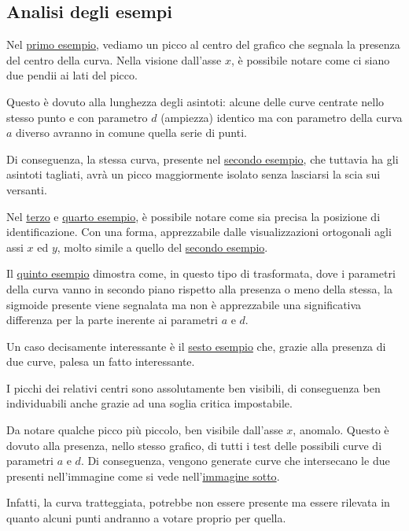 \newpage

\newpage

\subsection{Analisi degli esempi}
Nel \hyperref[fig:sintentica_ostinelli_1]{primo esempio}, vediamo un picco al centro del grafico che segnala la presenza del centro della curva. Nella visione dall'asse $x$, è possibile notare come ci siano due pendii ai lati del picco.\par
Questo è dovuto alla lunghezza degli asintoti: alcune delle curve centrate nello stesso punto e con parametro $d$ (ampiezza) identico ma con parametro della curva $a$ diverso avranno in comune quella serie di punti.\par
Di conseguenza, la stessa curva, presente nel \hyperref[fig:sintentica_ostinelli_2]{secondo esempio}, che tuttavia ha gli asintoti tagliati, avrà un picco maggiormente isolato senza lasciarsi la scia sui versanti.\par
Nel \hyperref[fig:sintentica_ostinelli_3]{terzo} e \hyperref[fig:sintentica_ostinelli_4]{quarto esempio}, è possibile notare come sia precisa la posizione di identificazione. Con una forma, apprezzabile dalle visualizzazioni ortogonali agli assi $x$ ed $y$, molto simile a quello del \hyperref[fig:sintentica_ostinelli_2]{secondo esempio}.\par
Il \hyperref[fig:sintentica_ostinelli_5]{quinto esempio} dimostra come, in questo tipo di trasformata, dove i parametri della curva vanno in secondo piano rispetto alla presenza o meno della stessa, la sigmoide presente viene segnalata ma non è apprezzabile una significativa differenza per la parte inerente ai parametri $a$ e $d$.\par
Un caso decisamente interessante è il \hyperref[fig:sintentica_ostinelli_6]{sesto esempio} che, grazie alla presenza di due curve, palesa un fatto interessante.\par
I picchi dei relativi centri sono assolutamente ben visibili, di conseguenza ben individuabili anche grazie ad una soglia critica impostabile.\par
Da notare qualche picco più piccolo, ben visibile dall'asse $x$, anomalo. Questo è dovuto alla presenza, nello stesso grafico, di tutti i test delle possibili curve di parametri $a$ e $d$. Di conseguenza, vengono generate curve che intersecano le due presenti nell'immagine come si vede nell'\hyperref[fig:sovrapposizione]{immagine sotto}.\par
Infatti, la curva tratteggiata, potrebbe non essere presente ma essere rilevata in quanto alcuni punti andranno a votare proprio per quella.

